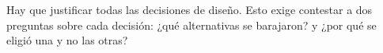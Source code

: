 \documentclass[12pt]{article}%
\begin{document}
Hay que justificar todas las decisiones de dise\~no. Esto exige contestar a dos preguntas sobre cada decisi\'on: ¿qu\'e alternativas se barajaron? y ¿por qu\'e se eligi\'o una y no las otras?



%
%
%
\end{document}
